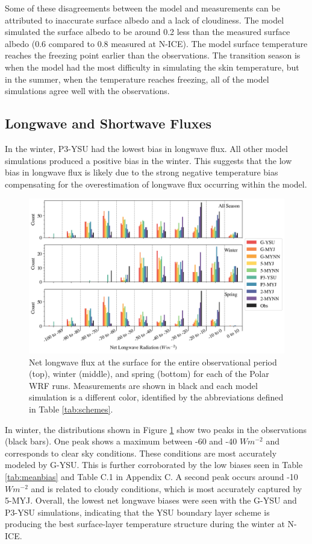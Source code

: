 Some of these disagreements between the model and measurements can be attributed to inaccurate surface albedo and a lack of cloudiness. The model simulated the surface albedo to be around 0.2 less than the measured surface albedo (0.6 compared to 0.8 measured at N-ICE). The model surface temperature reaches the freezing point earlier than the observations. The transition season is when the model had the most difficulty in simulating the skin temperature, but in the summer, when the temperature reaches freezing, all of the model simulations agree well with the observations. 

\subsection{Longwave and Shortwave Fluxes}
In the winter, P3-YSU had the lowest bias in longwave flux. All other model simulations produced a positive bias in the winter. This suggests that the low bias in longwave flux is likely due to the strong negative temperature bias compensating for the overestimation of longwave flux occurring within the model. 

  \begin{figure}[t]
    \centering
    \includegraphics[width=1\linewidth]{figures/chapter3/WRF_NetLW_Histo.png}
    \caption[Polar WRF simulated net longwave flux histograms.]{Net longwave flux at the surface for the entire observational period (top), winter (middle), and spring (bottom) for each of the Polar WRF runs. Measurements are shown in black and each model simulation is a different color, identified by the abbreviations defined in Table \ref{tab:schemes}.}
    \label{fig:wrf_netlw}
\end{figure}

 In winter, the distributions shown in Figure \ref{fig:wrf_netlw} show two peaks in the observations (black bars). One peak shows a maximum between -60 and -40 $Wm^{-2}$ and corresponds to clear sky conditions. These conditions are most accurately modeled by G-YSU. This is further corroborated by the low biases seen in Table \ref{tab:meanbias} and Table C.1 in Appendix C. A second peak occurs around -10 $Wm^{-2}$ and is related to cloudy conditions, which is most accurately captured by 5-MYJ. Overall, the lowest net longwave biases were seen with the G-YSU and P3-YSU simulations, indicating that the YSU boundary layer scheme is producing the best surface-layer temperature structure during the winter at N-ICE. 
 
